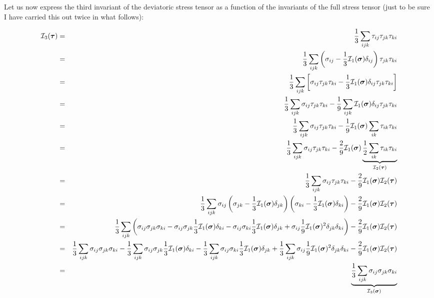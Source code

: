\newpage
Let us now express the third invariant of the deviatoric stress tensor 
as a function of the invariants of the full stress tensor (just to be sure
I have carried this out twice in what follows): 


\begin{eqnarray}
{\cal I}_3(\bm\tau) 
&=& \frac13 \sum_{ijk} \tau_{ij}\tau_{jk}\tau_{ki} \nn\\
&=& \frac13 \sum_{ijk} 
\left(\sigma_{ij}-\frac13 {\cal I}_1(\bm\sigma) \delta_{ij}\right)
\tau_{jk}\tau_{ki} \nn\\
&=& \frac13 \sum_{ijk} 
\left[ 
\sigma_{ij}
\tau_{jk}\tau_{ki} 
-\frac13 {\cal I}_1(\bm\sigma) \delta_{ij}
\tau_{jk}\tau_{ki} 
\right]
\nn\\
&=& \frac13 
\sum_{ijk} 
\sigma_{ij}
\tau_{jk}\tau_{ki} 
-\frac19
\sum_{ijk} 
 {\cal I}_1(\bm\sigma) \delta_{ij}
\tau_{jk}\tau_{ki}
\nn\\
&=& \frac13 
\sum_{ijk} 
\sigma_{ij}
\tau_{jk}\tau_{ki} 
-\frac19
 {\cal I}_1(\bm\sigma) 
\sum_{ik} 
\tau_{ik}\tau_{ki}  
\nn\\
&=& \frac13 
\sum_{ijk} 
\sigma_{ij}
\tau_{jk}\tau_{ki} 
-\frac29
 {\cal I}_1(\bm\sigma)  
\underbrace{\frac12
\sum_{ik} 
\tau_{ik}\tau_{ki}}_{{\cal I}_2(\bm\tau)}
\nn\\
&=& \frac13 
\sum_{ijk} 
\sigma_{ij}
\tau_{jk}\tau_{ki} 
-\frac29  {\cal I}_1(\bm\sigma)  {\cal I}_2(\bm\tau)
\nn\\
&=& \frac13 
\sum_{ijk} 
\sigma_{ij}
\left(\sigma_{jk}-\frac13 {\cal I}_1(\bm\sigma)  \delta_{jk}\right)
\left(\sigma_{ki}-\frac13 {\cal I}_1(\bm\sigma)  \delta_{ki}\right)
-\frac29  {\cal I}_1(\bm\sigma)    {\cal I}_2(\bm\tau) 
\nn\\
&=& \frac13 
\sum_{ijk} \left( 
\sigma_{ij} \sigma_{jk} \sigma_{ki}
-\sigma_{ij}\sigma_{jk}\frac13 {\cal I}_1(\bm\sigma)  \delta_{ki}
-\sigma_{ij}\sigma_{ki}\frac13 {\cal I}_1(\bm\sigma)  \delta_{jk}
+ \sigma_{ij} \frac19 {\cal I}_1(\bm\sigma) ^2 \delta_{jk} \delta_{ki}
\right)
-\frac29  {\cal I}_1(\bm\sigma)     {\cal I}_2(\bm\tau)
\nn\\
&=& 
\frac13 \sum_{ijk} \sigma_{ij} \sigma_{jk} \sigma_{ki} 
-\frac13 \sum_{ijk} \sigma_{ij}\sigma_{jk}\frac13 {\cal I}_1(\bm\sigma)  \delta_{ki}
-\frac13 \sum_{ijk} \sigma_{ij}\sigma_{ki}\frac13 {\cal I}_1(\bm\sigma)  \delta_{jk}
+\frac13 \sum_{ijk}  \sigma_{ij} \frac19 {\cal I}_1(\bm\sigma) ^2 \delta_{jk} \delta_{ki}
-\frac29  {\cal I}_1(\bm\sigma)      {\cal I}_2(\bm\tau)
\nn\\
&=& 
\underbrace{\frac13 \sum_{ijk} \sigma_{ij} \sigma_{jk} \sigma_{ki}}_{{\cal I}_3(\bm\sigma)}

\end{eqnarray}
